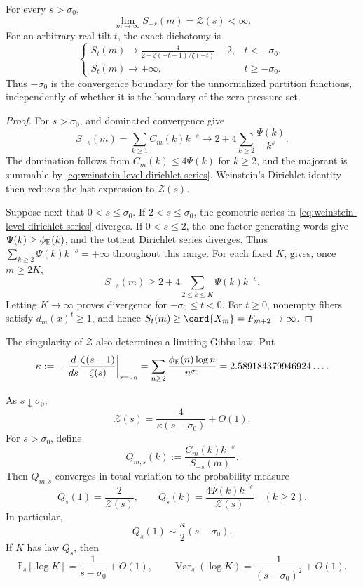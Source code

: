 \begin{theorem}
\label{thm:spectral-partition-function}
For every \(s>\sigma_0\),
\[
 \lim_{m\to\infty}S_{-s}(m)=\mathcal Z(s)<\infty.
\]
For an arbitrary real tilt \(t\), the exact dichotomy is
\[
 \begin{cases}
 S_t(m)\longrightarrow
 \displaystyle\frac{4}{2-\zeta(-t-1)/\zeta(-t)}-2,&t< -\sigma_0,\\[8pt]
 S_t(m)\longrightarrow+\infty,&t\ge-\sigma_0.
 \end{cases}
\]
Thus \(-\sigma_0\) is the convergence boundary for the unnormalized
partition functions, independently of whether it is the boundary of the
zero-pressure set.
\end{theorem}

\begin{proof}
For \(s>\sigma_0\),  and dominated convergence
give
\[
 S_{-s}(m)
 =\sum_{k\ge1}C_m(k)k^{-s}
 \longrightarrow
 2+4\sum_{k\ge2}\frac{\Psi(k)}{k^s}.
\]
The domination follows from \(C_m(k)\le4\Psi(k)\) for \(k\ge2\), and the
majorant is summable by
\eqref{eq:weinstein-level-dirichlet-series}.  Weinstein's Dirichlet identity
then reduces the last expression to \(\mathcal Z(s)\).

Suppose next that \(0<s\le\sigma_0\).  If \(2<s\le\sigma_0\), the geometric
series in \eqref{eq:weinstein-level-dirichlet-series} diverges.  If
\(0<s\le2\), the one-factor generating words give
\(\Psi(k)\ge\phi_{\rm E}(k)\), and the totient Dirichlet series diverges.
Thus \(\sum_{k\ge2}\Psi(k)k^{-s}=+\infty\) throughout this range.  For each
fixed \(K\),  gives, once \(m\ge2K\),
\[
 S_{-s}(m)\ge2+4\sum_{2\le k\le K}\Psi(k)k^{-s}.
\]
Letting \(K\to\infty\) proves divergence for
\(-\sigma_0\le t<0\).  For \(t\ge0\), nonempty fibers satisfy
\(d_m(x)^t\ge1\), and hence
\(S_t(m)\ge\card{X_m}=F_{m+2}\to\infty\).
\end{proof}

The singularity of \(\mathcal Z\) also determines a limiting Gibbs law.  Put
\[
 \kappa:=-\left.\frac{d}{ds}\frac{\zeta(s-1)}{\zeta(s)}
          \right|_{s=\sigma_0}
 =\sum_{n\ge2}\frac{\phi_{\rm E}(n)\log n}{n^{\sigma_0}}
 =2.589184379946924\ldots.
\]

\begin{theorem}
\label{thm:critical-gibbs-spectrum}
As \(s\downarrow\sigma_0\),
\[
 \mathcal Z(s)=\frac{4}{\kappa(s-\sigma_0)}+O(1).
\]
For \(s>\sigma_0\), define
\[
 Q_{m,s}(k):=\frac{C_m(k)k^{-s}}{S_{-s}(m)}.
\]
Then \(Q_{m,s}\) converges in total variation to the probability measure
\[
 Q_s(1)=\frac2{\mathcal Z(s)},
 \qquad
 Q_s(k)=\frac{4\Psi(k)k^{-s}}{\mathcal Z(s)}\quad(k\ge2).
\]
In particular,
\[
 Q_s(1)\sim\frac\kappa2(s-\sigma_0).
\]
If \(K\) has law \(Q_s\), then
\[
 \mathbb E_s[\log K]
 =\frac1{s-\sigma_0}+O(1),
 \qquad
 \operatorname{Var}_s(\log K)
 =\frac1{(s-\sigma_0)^2}+O(1).
\]
\end{theorem}

